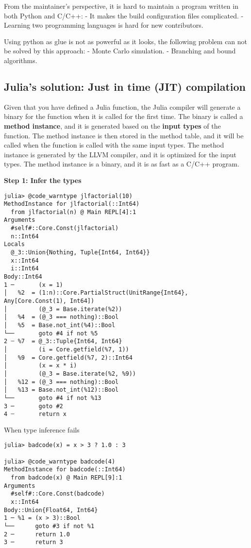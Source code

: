 \documentclass[
  notoc %
]{tufte-book}
\begin{document}
From the maintainer's perspective, it is hard to maintain a program
written in both Python and C/C++: - It makes the build configuration
files complicated. - Learning two programming languages is hard for new
contributors.

Using python as glue is not as powerful as it looks, the following
problem can not be solved by this approach: - Monte Carlo simulation. -
Branching and bound algorithms.

\hypertarget{julias-solution-just-in-time-jit-compilation}{%
\subsection{Julia's solution: Just in time (JIT)
compilation}\label{julias-solution-just-in-time-jit-compilation}}

Given that you have defined a Julia function, the Julia compiler will
generate a binary for the function when it is called for the first time.
The binary is called a \textbf{method instance}, and it is generated
based on the \textbf{input types} of the function. The method instance
is then stored in the method table, and it will be called when the
function is called with the same input types. The method instance is
generated by the LLVM compiler, and it is optimized for the input types.
The method instance is a binary, and it is as fast as a C/C++ program.

\textbf{Step 1: Infer the types}

\begin{lstlisting}
julia> @code_warntype jlfactorial(10)
MethodInstance for jlfactorial(::Int64)
  from jlfactorial(n) @ Main REPL[4]:1
Arguments
  #self#::Core.Const(jlfactorial)
  n::Int64
Locals
  @_3::Union{Nothing, Tuple{Int64, Int64}}
  x::Int64
  i::Int64
Body::Int64
1 ─       (x = 1)
│   %2  = (1:n)::Core.PartialStruct(UnitRange{Int64}, Any[Core.Const(1), Int64])
│         (@_3 = Base.iterate(%2))
│   %4  = (@_3 === nothing)::Bool
│   %5  = Base.not_int(%4)::Bool
└──       goto #4 if not %5
2 ┄ %7  = @_3::Tuple{Int64, Int64}
│         (i = Core.getfield(%7, 1))
│   %9  = Core.getfield(%7, 2)::Int64
│         (x = x * i)
│         (@_3 = Base.iterate(%2, %9))
│   %12 = (@_3 === nothing)::Bool
│   %13 = Base.not_int(%12)::Bool
└──       goto #4 if not %13
3 ─       goto #2
4 ┄       return x
\end{lstlisting}

When type inference fails

\begin{lstlisting}
julia> badcode(x) = x > 3 ? 1.0 : 3

julia> @code_warntype badcode(4)
MethodInstance for badcode(::Int64)
  from badcode(x) @ Main REPL[9]:1
Arguments
  #self#::Core.Const(badcode)
  x::Int64
Body::Union{Float64, Int64}
1 ─ %1 = (x > 3)::Bool
└──      goto #3 if not %1
2 ─      return 1.0
3 ─      return 3
\end{lstlisting}
\end{document}
